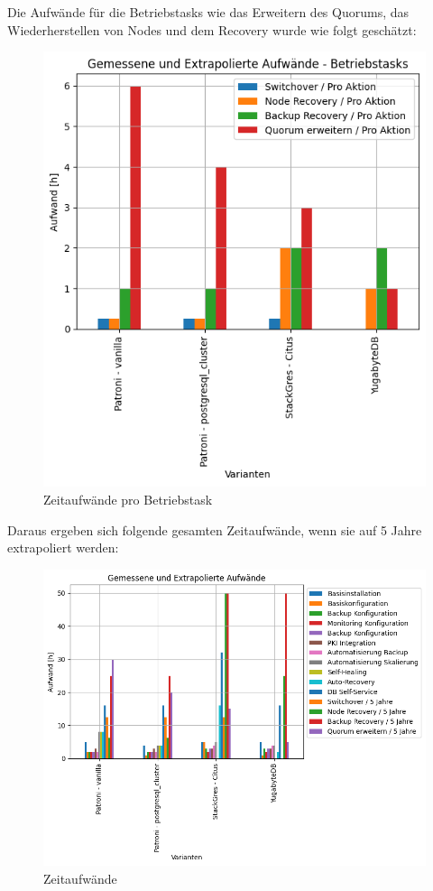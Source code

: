 \begin{flushleft}
    \clearpage
    Die Aufwände für die Betriebstasks wie das Erweitern des Quorums, das Wiederherstellen von Nodes und dem Recovery wurde wie folgt geschätzt:
    \begin{figure}[H]
        \centering
        \includegraphics[width=0.75\linewidth]{source/pandas_data_chart_plotter/time_investment_action}
        \caption{Zeitaufwände pro Betriebstask}
        \label{fig:time_investment_action}
    \end{figure}
\end{flushleft}
\clearpage
\begin{flushleft}
    Daraus ergeben sich folgende gesamten Zeitaufwände, wenn sie auf 5 Jahre extrapoliert werden:
    \begin{figure}[H]
        \centering
        \includegraphics[width=1\linewidth]{source/pandas_data_chart_plotter/time_investment}
        \caption{Zeitaufwände}
        \label{fig:time_investment}
    \end{figure}
\end{flushleft}
